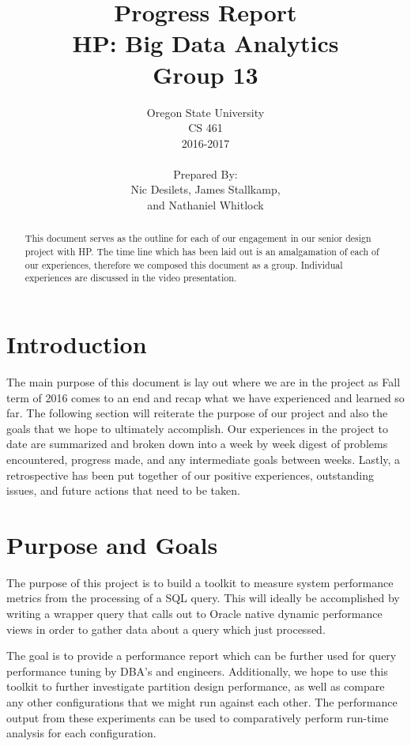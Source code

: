 \documentclass[draftclsnofoot, onecolumn, compsoc, 10pt]{IEEEtran}
\title{\Huge Progress Report\\\large HP: Big Data Analytics\\Group 13}
\author{Oregon State University\\CS 461\\2016-2017\\\\Prepared By:\\Nic Desilets, James Stallkamp,\\and Nathaniel Whitlock}
\begin{document}
\begin{titlingpage}
    \maketitle 
    
    \vspace{1in}
    \begin{abstract}
		\noindent This document serves as the outline for each of our engagement in our senior design project with HP.
        The time line which has been laid out is an amalgamation of each of our experiences, therefore we composed this document as a group.
        Individual experiences are discussed in the video presentation.

    \end{abstract}
\end{titlingpage}

{\small\tableofcontents} %
\pagebreak

\section{Introduction}
The main purpose of this document is lay out where we are in the project as Fall term of 2016 comes to an end and recap what we have experienced and learned so far.
The following section will reiterate the purpose of our project and also the goals that we hope to ultimately accomplish.
Our experiences in the project to date are summarized and broken down into a week by week digest of problems encountered, progress made, and any intermediate goals between weeks.
Lastly, a retrospective has been put together of our positive experiences, outstanding issues, and future actions that need to be taken. 

\section{Purpose and Goals}
The purpose of this project is to build a toolkit to measure system performance metrics from the processing of a SQL query.
This will ideally be accomplished by writing a wrapper query that calls out to Oracle native dynamic performance views in order to gather data about a query which just processed.

The goal is to provide a performance report which can be further used for query performance tuning by DBA's and engineers.
Additionally, we hope to use this toolkit to further investigate partition design performance, as well as compare any other configurations that we might run against each other.
The performance output from these experiments can be used to comparatively perform run-time analysis for each configuration.
\end{document}
